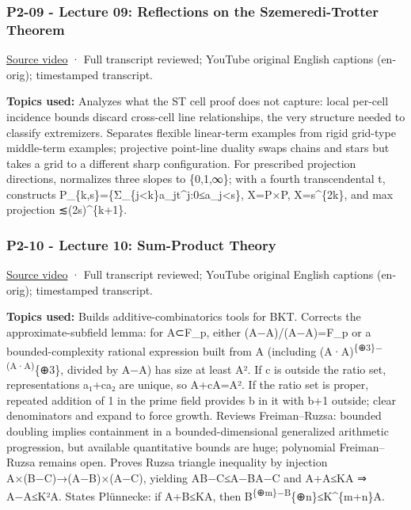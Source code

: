 \subsubsection{P2-09 - Lecture 09: Reflections on the Szemeredi-Trotter Theorem}\label{04-visual-computing-ii-ch036-p2-09---lecture-09-reflections-on-the-szemeredi-trotter-theorem}

\hypertarget{04-visual-computing-ii-ch036-p2-09---lecture-09-reflections-on-the-szemeredi-trotter-theorem}{}

\href{https://www.youtube.com/watch?v=lvdIUKULiak}{Source video} · Full transcript reviewed; YouTube original English captions (en-orig); timestamped transcript.

\textbf{Topics used:} Analyzes what the ST cell proof does not capture: local per-cell incidence bounds discard cross-cell line relationships, the very structure needed to classify extremizers. Separates flexible linear-term examples from rigid grid-type middle-term examples; projective point-line duality swaps chains and stars but takes a grid to a different sharp configuration. For prescribed projection directions, normalizes three slopes to \{0,1,∞\}; with a fourth transcendental t, constructs P\_\{k,s\}=\{Σ\_\{j\textless k\}a\_jt\^{}j:0≤a\_j\textless s\}, X=P×P, \textbar X\textbar=s\^{}\{2k\}, and max projection ≲(2s)\^{}\{k+1\}.

\subsubsection{P2-10 - Lecture 10: Sum-Product Theory}\label{04-visual-computing-ii-ch036-p2-10---lecture-10-sum-product-theory}

\hypertarget{04-visual-computing-ii-ch036-p2-10---lecture-10-sum-product-theory}{}

\href{https://www.youtube.com/watch?v=VCOrx2jEKXk}{Source video} · Full transcript reviewed; YouTube original English captions (en-orig); timestamped transcript.

\textbf{Topics used:} Builds additive-combinatorics tools for BKT. Corrects the approximate-subfield lemma: for A⊂F\_p, either (A−A)/(A−A)=F\_p or a bounded-complexity rational expression built from A (including (A·A)\textsuperscript{\{⊕3\}−(A·A)}\{⊕3\}, divided by A−A) has size at least \textbar A\textbar². If c is outside the ratio set, representations a₁+ca₂ are unique, so \textbar A+cA\textbar=\textbar A\textbar². If the ratio set is proper, repeated addition of 1 in the prime field provides b in it with b+1 outside; clear denominators and expand to force growth. Reviews Freiman--Ruzsa: bounded doubling implies containment in a bounded-dimensional generalized arithmetic progression, but available quantitative bounds are huge; polynomial Freiman--Ruzsa remains open. Proves Ruzsa triangle inequality by injection A×(B−C)→(A−B)×(A−C), yielding \textbar A\textbar\textbar B−C\textbar≤\textbar A−B\textbar\textbar A−C\textbar{} and \textbar A+A\textbar≤K\textbar A\textbar{} ⇒ \textbar A−A\textbar≤K²\textbar A\textbar. States Plünnecke: if \textbar A+B\textbar≤K\textbar A\textbar, then \textbar B\textsuperscript{\{⊕m\}−B}\{⊕n\}\textbar≤K\^{}\{m+n\}\textbar A\textbar.

